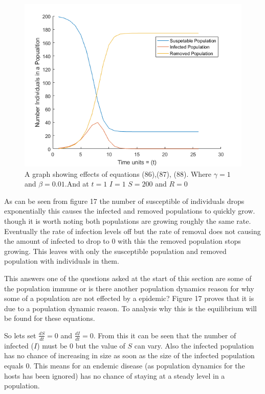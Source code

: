 \documentclass[final]{cmpreport}
\begin{document}
	\begin{figure}[h!] 
		\includegraphics[width=\textwidth]{Epidmic.png} 
		\caption{ A graph showing effects of equations (86),(87), (88). Where $\gamma = 1$ and $\beta = 0.01$.And at $t=1$ $I=1$ $S=200$ and $R=0$}
	\end{figure}
	
	As can be seen from figure 17 the number of susceptible of individuals drops exponentially this causes the infected and removed populations to quickly grow. though it is worth noting both populations are growing roughly the same rate. Eventually the rate of infection levels off but the rate of removal does not causing the amount of infected to drop to 0 with this the removed population stops growing. This leaves with only the susceptible population and removed population with individuals in them.
		
	This answers one of the questions asked at the start of this section are some of the population immune or is there another population dynamics reason for why some of a population are not effected by a epidemic? Figure 17 proves that it is due to a population dynamic reason. To analysis why this is the equilibrium will be found for these equations.
		
		
		
	So lets set $\frac{dS}{dt} = 0 $ and $\frac{dI}{dt} = 0$. From this it can be seen that the number of infected ($I$) must be 0 but the value of $S$ can vary. Also the infected population has no chance of increasing in size as soon as the size of the infected population equals 0. This means for an endemic disease (as population dynamics for the hosts has been ignored) has no chance of staying at a steady level in a population. 
		
\end{document}
